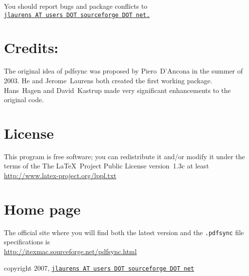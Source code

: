 \documentclass[pagesize=auto, fontsize=12, DIV=11]{scrartcl}
\newcommand*{\pkg}[1]{\textsf{#1}}
\begin{document}
You should report bugs and package conflicts to \\
\null\quad\quad\href{mailto:jlaurens@users.sourceforge.net}{\texttt{jlaurens AT users DOT sourceforge DOT net.}}


\section{Credits:}

The original idea of \pkg{pdfsync} was proposed by Piero~D'Ancona in the summer of 2003.
He and Jerome~Laurens both created the first working package.
Hans~Hagen and David~Kastrup made very significant enhancements to the original code.


\section{License}

This program is free software; you can redistribute it and/or modify
it under the terms of the The \LaTeX\ Project Public License version~1.3c at least \\
\url{http://www.latex-project.org/lppl.txt}


\section{Home page}

The official site where you will find both the latest version and the \texttt{.pdfsync} file specifications is \\
\null\quad\quad\url{http://itexmac.sourceforge.net/pdfsync.html}

\bigskip

copyright 2007, \href{mailto:jlaurens@users.sourceforge.net}{\texttt{jlaurens AT users DOT sourceforge DOT net}}
\end{document}
